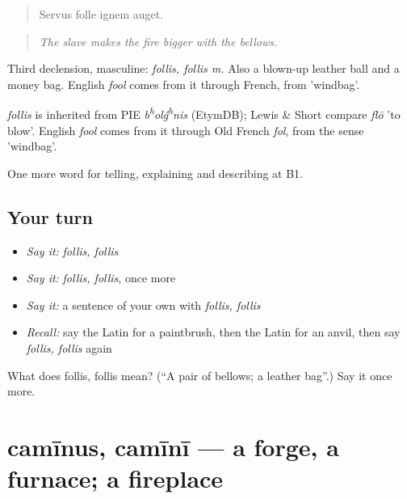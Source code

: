 \begin{quote}
Servus folle ignem auget.
\end{quote}

\begin{quote}
\emph{The slave makes the fire bigger with the bellows.}
\end{quote}

Third declension, masculine: \emph{follis, follis m.} Also a blown-up leather ball and a money bag. English \emph{fool} comes from it through French, from 'windbag'.

\begin{cousinweb}
\emph{follis} is inherited from PIE \emph{b\textsuperscript{h}olǵ\textsuperscript{h}nis} (EtymDB); Lewis \& Short compare \emph{flō} 'to blow'. English \emph{fool} comes from it through Old French \emph{fol}, from the sense 'windbag'.
\end{cousinweb}

\begin{grammarlens}[title={What you've built}]
One more word for telling, explaining and describing at B1.
\end{grammarlens}

\subsection*{Your turn}
\begin{itemize}
\raggedright
  \item \emph{Say it:} \emph{follis, follis}
  \item \emph{Say it:} \emph{follis, follis}, once more
  \item \emph{Say it:} a sentence of your own with \emph{follis, follis}
  \item \emph{Recall:} say the Latin for a paintbrush, then the Latin for an anvil, then say \emph{follis, follis} again
\end{itemize}

\begin{tcolorbox}[breakable,colback=teal!4,colframe=teal!35!black,title={Before you move on}]
What does follis, follis mean? (\textquotedblleft{}A pair of bellows; a leather bag\textquotedblright{}.) Say it once more.
\end{tcolorbox}
\section[camīnus, camīnī]{camīnus, camīnī — a forge, a furnace; a fireplace}

